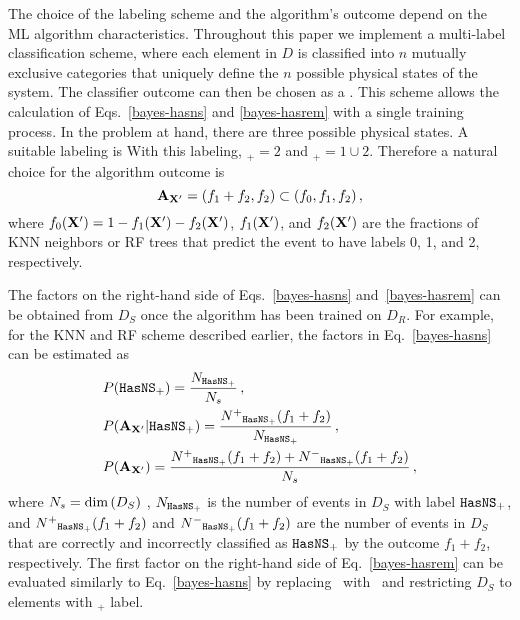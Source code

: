 The choice of the labeling scheme and the algorithm's outcome depend on the \ac{ML} algorithm characteristics. Throughout this paper we implement a multi-label classification scheme,
where each element in $D$ is classified into $n$ mutually exclusive categories that uniquely define the $n$ possible physical states of the system. The classifier outcome can then be
chosen as a . This scheme allows the calculation of Eqs.~\eqref{bayes-hasns} and \eqref{bayes-hasrem} with a single
training process. In the problem at hand, there are three possible physical states. A suitable labeling is
%
%
With this labeling, \hasrem$_+=2$ and \hasns$_+=1\cup 2$. Therefore a natural choice for the algorithm outcome is
%
\begin{equation}
{\bf A}_{\bf X'}=(f_1+f_2,f_2)\subset (f_0,f_1,f_2)\,,
\end{equation}
%
where $f_0({\bf X}')=1-f_1({\bf X}')-f_2({\bf X}')$, $f_1({\bf X}')$, and $f_2({\bf X}')$ are the fractions of \ac{KNN} neighbors or \ac{RF} trees that predict the event to
have labels 0, 1, and 2, respectively.

The factors on the right-hand side of Eqs.~\eqref{bayes-hasns} and~\eqref{bayes-hasrem} can be obtained from $D_{S}$ once the algorithm has been trained on $D_{R}$. For example, for the \ac{KNN} and \ac{RF} scheme described earlier, the factors in Eq.~\eqref{bayes-hasns} can be estimated as  
%
\begin{align}
&P({{\tt HasNS}}_+)=\frac{N_{{{\tt HasNS}}_+}}{N_s}\,,\nonumber\\
&P({\bf A}_{{\bf X}'}|{{\tt HasNS}}_+)=\frac{N^+{}_{{{\tt HasNS}}_+}(f_1+f_2)}{N_{{{\tt HasNS}}_+}}\,,\\
&P({\bf A}_{{\bf X}'})=\frac{N^+{}_{{{\tt HasNS}}_+}(f_1+f_2)+N^-{}_{{{\tt HasNS}}_+}(f_1+f_2)}{N_s}\,,\nonumber
\label{bayes-est}
\end{align}
%
where $N_s=\hbox{dim}\,(D_S)$ , $N_{{{\tt HasNS}}_+}$ is the number of events in $D_S$ with label  ${{\tt HasNS}}_+$, and $N^+{}_{{{\tt HasNS}}_+}(f_1+f_2)$ and $N^-{}_{{{\tt HasNS}}_+}(f_1+f_2)$ are the number of
events in $D_S$ that are correctly and incorrectly classified as ${{{\tt HasNS}}_+}$ by the outcome $f_1+f_2$, respectively. The first factor on the right-hand side of Eq.~\eqref{bayes-hasrem}
can be evaluated similarly to Eq.~\eqref{bayes-hasns} by replacing \hasns\ with \hasrem\ and restricting $D_S$ to elements with \hasns$_+$ label.

